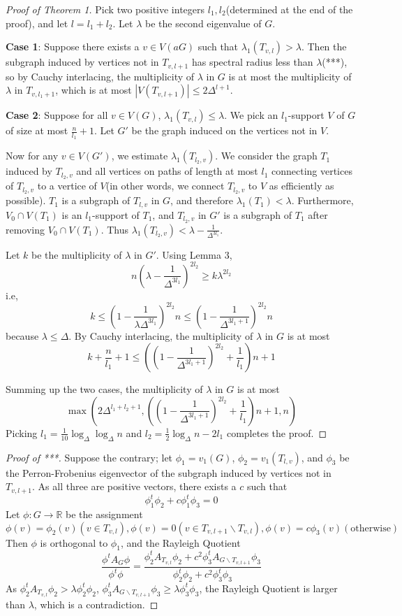\documentclass{article}
\theoremstyle{definition} %
\theoremstyle{plain} %
\begin{document}
\begin{proof}[Proof of Theorem 1]
Pick two positive integers $l_1, l_2$(determined at the end of the proof), and let $l = l_1 + l_2$. Let $\lambda$ be the second eigenvalue of $G$.

\textbf{Case 1}: Suppose there exists a $v\in V(a G)$ such that $\lambda_1(T_{v, l}) > \lambda$. Then the subgraph induced by vertices not in $T_{v, l + 1}$ has spectral radius less than $\lambda$(***), so by Cauchy interlacing, the multiplicity of $\lambda$ in $G$ is at most the multiplicity of $\lambda$ in $T_{v, l_1 + 1}$, which is at most $|V(T_{v, l + 1})| \leq 2\Delta^{l+1}$.

\textbf{Case 2}: Suppose for all $v\in V(G)$, $\lambda_1(T_{v, l}) \leq \lambda$. We pick an $l_1$-support $V$ of $G$ of size at most $\frac{n}{l_1} + 1$. Let $G'$ be the graph induced on the vertices not in $V$.

Now for any $v\in V(G')$, we estimate $\lambda_1(T_{l_2,v})$. We consider the graph $T_1$ induced by $T_{l_2,v}$ and all vertices on paths of length at most $l_1$ connecting vertices of  $T_{{l_2},v}$ to a vertice of $V$(in other words, we connect $T_{l_2,v}$ to $V$ as efficiently as possible). $T_1$ is a subgraph of $T_{l,v}$ in $G$, and therefore $\lambda_1(T_1) < \lambda$. Furthermore, $V_0\cap V(T_1)$ is an $l_1$-support of $T_1$, and $T_{l_2,v}$ in $G'$ is a subgraph of $T_1$ after removing $V_0\cap V(T_1)$. Thus $\lambda_1(T_{l_2,v}) < \lambda - \frac{1}{\Delta^{3l_1}}$. 

Let $k$ be the multiplicity of $\lambda$ in $G'$. Using Lemma 3,
$$n(\lambda - \frac{1}{\Delta^{3l_1}})^{2l_2} \geq k\lambda^{2l_2}$$
i.e,
$$k \leq (1 - \frac{1}{\lambda\Delta^{3l_1}})^{2l_2}n \leq (1 - \frac{1}{\Delta^{3l_1+1}})^{2l_2}n$$
because $\lambda \leq \Delta$. By Cauchy interlacing, the multiplicity of $\lambda$ in $G$ is at most
$$k + \frac{n}{l_1} + 1 \leq ((1 - \frac{1}{\Delta^{3l_1+1}})^{2l_2} + \frac{1}{l_1})n + 1$$

Summing up the two cases, the multiplicity of $\lambda$ in $G$ is at most
$$\max(2\Delta^{l_1+l_2+1}, ((1 - \frac{1}{\Delta^{3l_1+1}})^{2l_2} + \frac{1}{l_1})n + 1, n)$$
Picking $l_1 = \frac{1}{10}\log_{\Delta}\log_{\Delta}n$ and $l_2 = \frac{1}{2}\log_{\Delta}n - 2l_1$ completes the proof.
\end{proof}
\begin{proof}[Proof of ***]
Suppose the contrary; let $\phi_1 = v_1(G)$, $\phi_2 = v_1(T_{l,v})$, and $\phi_3$ be the Perron-Frobenius eigenvector of the subgraph induced by vertices not in $T_{v, l + 1}$. As all three are positive vectors, there exists a $c$ such that
$$\phi_1^t\phi_2 + c\phi_1^t\phi_3 = 0$$
Let $\phi:G\to\mathbb{R}$ be the assignment
$$\phi(v) = \phi_2(v)(v\in T_{v, l}), \phi(v) = 0(v\in T_{v, l + 1}\backslash T_{v, l}), \phi(v) = c\phi_3(v)(\text{otherwise})$$
Then $\phi$ is orthogonal to $\phi_1$, and the Rayleigh Quotient
$$\frac{\phi^tA_G\phi}{\phi^t\phi} = \frac{\phi_2^tA_{T_{v, l}}\phi_2 + c^2\phi_3^tA_{G\backslash T_{v, l + 1}}\phi_3}{\phi_2^t\phi_2 + c^2\phi_3^t\phi_3}$$
As $\phi_2^tA_{T_{v, l}}\phi_2 > \lambda\phi_2^t\phi_2$, $\phi_3^tA_{G\backslash T_{v, l + 1}}\phi_3 \geq \lambda \phi_3^t\phi_3$, the Rayleigh Quotient is larger than $\lambda$, which is a contradiction.
\end{proof}
\end{document}
